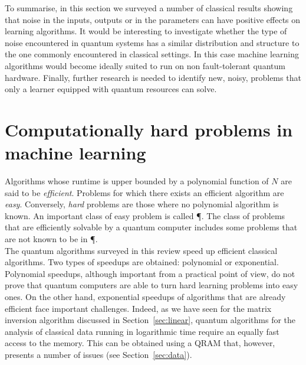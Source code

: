 \documentclass[a4paper, 11pt]{article}
\newcommand{\AI}[1]{{\color{magenta} #1}}
\begin{document}
To summarise, in this section we surveyed a number of classical results showing that noise in the inputs, outputs or in the parameters can have positive effects on  learning algorithms. It would be interesting to investigate whether the type of noise encountered in quantum systems has a similar distribution and structure to the one commonly encountered in classical settings. In this case machine learning algorithms would become ideally suited to run on non fault-tolerant quantum hardware. Finally, further research is needed to identify new, noisy, problems that only a learner equipped with quantum resources can solve.

\section{Computationally hard problems in machine learning}
\label{sec:hard}

Algorithms whose runtime is upper bounded by a polynomial function of $N$ are said to be \textit{efficient}. Problems for which there exists an efficient algorithm are \textit{easy}. Conversely, \textit{hard} problems are those where no polynomial algorithm is known. An important class of easy problem is called \P. The class of problems that are efficiently solvable by a quantum computer includes some problems that are not known to be in \P.\\


The quantum algorithms surveyed in this review speed up efficient classical algorithms. Two types of speedups are obtained: polynomial or exponential. Polynomial speedups, although important from a practical point of view, do not prove that quantum computers are able to turn hard learning problems into easy ones. On the other hand, exponential speedups of algorithms that are already efficient face important challenges. Indeed, as we have seen for the matrix inversion algorithm discussed in Section~\ref{sec:linear}, quantum algorithms for the analysis of classical data running in logarithmic time require an equally fast access to the memory. This can be obtained using a QRAM that, however, presents a number of issues (see Section~\ref{sec:data}).\\
\end{document}
